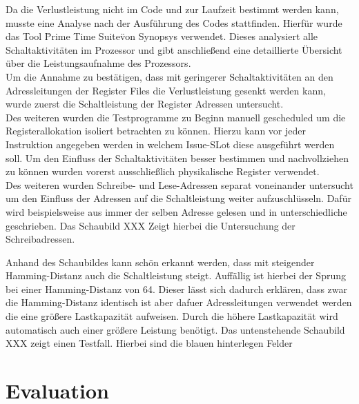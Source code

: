 Da die Verlustleistung nicht im Code und zur Laufzeit bestimmt werden kann, musste eine Analyse nach der Ausführung des Codes stattfinden. Hierfür wurde das Tool \"Prime Time Suite\" von Synopsys verwendet. Dieses analysiert alle Schaltaktivitäten im Prozessor und gibt anschließend eine detaillierte Übersicht über die Leistungsaufnahme des Prozessors.\\
Um die Annahme zu bestätigen, dass mit geringerer Schaltaktivitäten an den Adressleitungen der Register Files die Verlustleistung gesenkt werden kann, wurde zuerst die Schaltleistung der Register Adressen untersucht.\\
Des weiteren wurden die Testprogramme zu Beginn manuell gescheduled um die Registerallokation isoliert betrachten zu können. Hierzu kann vor jeder Instruktion angegeben werden in welchem Issue-SLot diese ausgeführt werden soll. Um den Einfluss der Schaltaktivitäten besser bestimmen und nachvollziehen zu können wurden vorerst ausschließlich physikalische Register verwendet. \\
Des weiteren wurden Schreibe- und Lese-Adressen separat voneinander untersucht um den Einfluss der Adressen auf die Schaltleistung weiter aufzuschlüsseln. Dafür wird beispielsweise aus immer der selben Adresse gelesen und in unterschiedliche geschrieben. Das Schaubild XXX Zeigt hierbei die Untersuchung der Schreibadressen.

%	
Anhand des Schaubildes kann schön erkannt werden, dass mit steigender Hamming-Distanz auch die Schaltleistung steigt. Auffällig ist hierbei der Sprung bei einer Hamming-Distanz von 64. Dieser lässt sich dadurch erklären, dass zwar die Hamming-Distanz identisch ist aber dafuer Adressleitungen verwendet werden die eine größere Lastkapazität aufweisen. Durch die höhere Lastkapazität wird automatisch auch einer größere Leistung benötigt.
Das untenstehende Schaubild XXX zeigt einen Testfall. Hierbei sind die blauen hinterlegen Felder 

\section{Evaluation}
\label{sec:evalutation_verification}